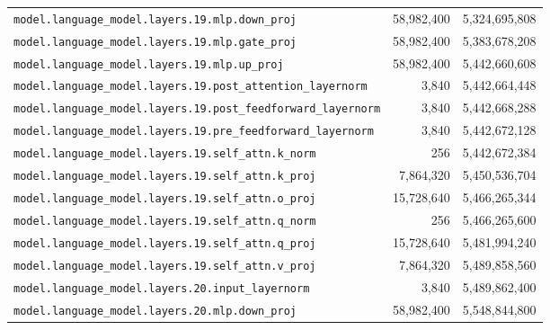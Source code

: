 \documentclass[10pt,a4paper]{article}
\theoremstyle{definition}
\begin{document}
\begin{appendices}
\begin{longtable}{p{9.5cm}rr}
\texttt{model.\allowbreak{}language\_model.\allowbreak{}layers.\allowbreak{}19.\allowbreak{}mlp.\allowbreak{}down\_proj} & 58,982,400 & 5,324,695,808 \\
\texttt{model.\allowbreak{}language\_model.\allowbreak{}layers.\allowbreak{}19.\allowbreak{}mlp.\allowbreak{}gate\_proj} & 58,982,400 & 5,383,678,208 \\
\texttt{model.\allowbreak{}language\_model.\allowbreak{}layers.\allowbreak{}19.\allowbreak{}mlp.\allowbreak{}up\_proj} & 58,982,400 & 5,442,660,608 \\
\texttt{model.\allowbreak{}language\_model.\allowbreak{}layers.\allowbreak{}19.\allowbreak{}post\_attention\_layernorm} & 3,840 & 5,442,664,448 \\
\texttt{model.\allowbreak{}language\_model.\allowbreak{}layers.\allowbreak{}19.\allowbreak{}post\_feedforward\_layernorm} & 3,840 & 5,442,668,288 \\
\texttt{model.\allowbreak{}language\_model.\allowbreak{}layers.\allowbreak{}19.\allowbreak{}pre\_feedforward\_layernorm} & 3,840 & 5,442,672,128 \\
\texttt{model.\allowbreak{}language\_model.\allowbreak{}layers.\allowbreak{}19.\allowbreak{}self\_attn.\allowbreak{}k\_norm} & 256 & 5,442,672,384 \\
\texttt{model.\allowbreak{}language\_model.\allowbreak{}layers.\allowbreak{}19.\allowbreak{}self\_attn.\allowbreak{}k\_proj} & 7,864,320 & 5,450,536,704 \\
\texttt{model.\allowbreak{}language\_model.\allowbreak{}layers.\allowbreak{}19.\allowbreak{}self\_attn.\allowbreak{}o\_proj} & 15,728,640 & 5,466,265,344 \\
\texttt{model.\allowbreak{}language\_model.\allowbreak{}layers.\allowbreak{}19.\allowbreak{}self\_attn.\allowbreak{}q\_norm} & 256 & 5,466,265,600 \\
\texttt{model.\allowbreak{}language\_model.\allowbreak{}layers.\allowbreak{}19.\allowbreak{}self\_attn.\allowbreak{}q\_proj} & 15,728,640 & 5,481,994,240 \\
\texttt{model.\allowbreak{}language\_model.\allowbreak{}layers.\allowbreak{}19.\allowbreak{}self\_attn.\allowbreak{}v\_proj} & 7,864,320 & 5,489,858,560 \\
\texttt{model.\allowbreak{}language\_model.\allowbreak{}layers.\allowbreak{}20.\allowbreak{}input\_layernorm} & 3,840 & 5,489,862,400 \\
\texttt{model.\allowbreak{}language\_model.\allowbreak{}layers.\allowbreak{}20.\allowbreak{}mlp.\allowbreak{}down\_proj} & 58,982,400 & 5,548,844,800 \\

\end{longtable}
\end{appendices}
\end{document}
